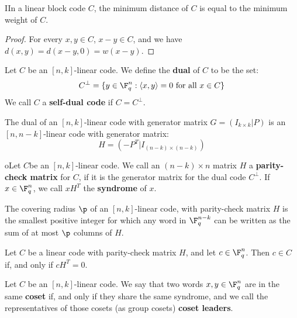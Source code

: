 \begin{lemma}\label{lemma_1.2.4}
  IIn a linear block code $C$, the minimum distance of  $C$ is equal to the
  minimum weight of $C$.
\end{lemma}
\begin{proof}
  For every $x,y \in C$, $x-y \in C$, and we have $d(x,y)=d(x-y,0)=w(x-y)$.
\end{proof}

\begin{definition}
  Let $C$ be an $[n,k]$-linear code. We define the \textbf{dual} of $C$ to
  be the set:
  \begin{equation}\label{equation_1.7}
    C^\perp=\{y \in \F_q^n : \langle x,y \rangle=0 \text{ for all } x \in C\}
  \end{equation}
  We call $C$ a  \textbf{self-dual code} if $C=C^\perp$.
\end{definition}

\begin{lemma}\label{1.2.5}
  The dual of an $[n,k]$-linear code with generator matrix $G=(I_{k \times
  k} | P)$ is an $[n,n-k]$-linear code with generator matrix:
  \begin{equation}\label{equation_1.8}
    H=(-P^T | I_{(n-k) \times (n-k)})
  \end{equation}
\end{lemma}

\begin{definition}
  oLet $C$be an  $[n,k]$-linear code. We call an $(n-k) \times n$ matrix
  $H$ a  \textbf{parity-check matrix} for $C$, if it is the generator
  matrix for the dual code $C^\perp$. If $x \in \F_q^n$, we call $xH^T$ the
  \textbf{syndrome} of $x$.
\end{definition}

\begin{lemma}\label{lemma_1.2.6}
  The covering radius $\p$ of an $[n,k]$-linear code, with parity-check
  matrix $H$ is the smallest positive integer for which any word in
  $\F_q^{n-k}$ can be written as the sum of at most $\p$ columns of $H$.
\end{lemma}

\begin{lemma}\label{lemma_1.2.7}
  Let $C$ be a linear code with parity-check matrix $H$, and let $c \in
  \F_q^n$. Then $c \in C$ if, and only if $cH^T=0$.
\end{lemma}

\begin{definition}
  Let $C$ be an  $[n,k]$-linear code. We say that two words $x,y \in
  \F_q^n$ are in the same \textbf{coset} if, and only if they share the
  same syndrome, and we call the representatives of those cosets (as group
  cosets) \textbf{coset leaders}.
\end{definition}
